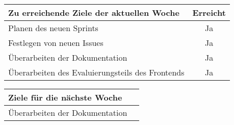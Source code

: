 \begin{tabularx}{\textwidth}{Xc}
    \arrayrulecolor{OliveGreen}
    \toprule
    {\bfseries Zu erreichende Ziele der aktuellen Woche} & {\bfseries Erreicht} \\
    \midrule[2pt]
    Planen des neuen Sprints                                &Ja              \\
    \rowcolor{OliveGreen!15}
    Festlegen von neuen Issues                              &Ja              \\
    \rowcolor{White}
    Überarbeiten der Dokumentation                          &Ja              \\
    \rowcolor{OliveGreen!15}
    Überarbeiten des Evaluierungsteils des Frontends        &Ja              \\
    \bottomrule[2pt]
\end{tabularx}
%
\vspace{1cm}
%
\begin{tabularx}{\textwidth}{Xc}
    \arrayrulecolor{OliveGreen}
    \toprule
    {\bfseries Ziele für die nächste Woche}        &                         \\
    \midrule[2pt]
    Überarbeiten der Dokumentation                 &                         \\
\end{tabularx}
